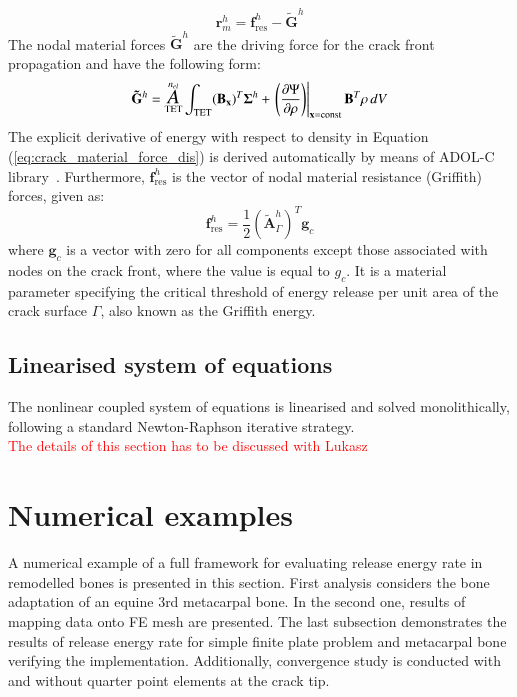 \documentclass[11pt]{ACMEarticle}
\DeclareMathOperator*{\aoperator}{\text{\Large $A$}}
\numberwithin{equation}{section}
\begin{document}
\begin{equation}
\mathbf r_m^h = \mathbf f^h_{\text{res}} - \mathbf{\tilde G}^h
\end{equation}
The nodal material forces $\mathbf{\tilde G}^h$ are the driving force for the crack front propagation and have the following form:
\begin{equation}\label{eq:crack_material_force_dis}
\mathbf{\tilde G}^h = \aoperator_{\text{TET}}^{n_{el}} \int_\text{TET} (\mathbf{B_x})^T \mathbf \Sigma^h +   \left.\left( \frac{\partial \Psi}{\partial \rho} \right)\right|_{\mathbf{x}= \text {const}} \mathbf B^T \rho \mathrm \,d V
\end{equation}
The explicit derivative of energy with respect to density in Equation (\ref{eq:crack_material_force_dis}) is derived automatically by means of ADOL-C library~\citep{Walther2009}. Furthermore, $\mathbf f^h_{\text {res}}$ is the vector of nodal material resistance (Griffith) forces, given as:
\begin{equation}
\mathbf f^h_{\text{res}} = \frac{1}{2} (\mathbf{\tilde A}^h_\Gamma)^T \mathbf g_c
\end{equation}
where $ \mathbf g_c$ is a vector with zero for all components except those associated with nodes on the crack front, where the value is equal to $g_c$. It is a material parameter specifying the critical threshold of energy release per unit area of the crack surface $\Gamma$, also known as the Griffith energy.
\subsection{Linearised system of equations}
The nonlinear coupled system of equations is linearised and solved monolithically, following a standard Newton-Raphson iterative strategy. \\

\textcolor{red}{The details of this section has to be discussed with Lukasz}

\section{Numerical examples}
\label{sec:numerical_examples}
A numerical example of a full framework for evaluating release energy rate in remodelled bones is presented in this section. First analysis considers the bone adaptation of an equine 3rd metacarpal bone. In the second one, results of mapping data onto FE mesh are presented. The last subsection demonstrates the results of release energy rate for simple finite plate problem and metacarpal bone verifying the implementation. Additionally, convergence study is conducted with and without quarter point elements at the crack tip.
\end{document}
